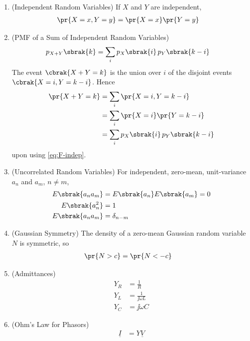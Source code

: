 \begin{enumerate}[label=\thesubsection.\arabic*, ref=\thesubsection.\theenumi, itemsep=0pt, leftmargin=0pt, labelwidth=0pt, itemindent=0pt, labelsep=1em, align=right]
\item (Independent Random Variables) If $X$ and $Y$ are independent,
\begin{align}
\pr{X = x, Y = y} &= \pr{X = x}\pr{Y = y}
\label{eq:F-indep}
\end{align}

\item (PMF of a Sum of Independent Random Variables)
\begin{align}
p_{X+Y}\sbrak{k} &= \sum_{i} p_X\sbrak{i}\, p_Y\sbrak{k - i}
\label{eq:F-conv-pmf}
\end{align}
\solution The event $\cbrak{X + Y = k}$ is the union over $i$ of the disjoint events $\cbrak{X = i, Y = k - i}$. Hence
\begin{align}
\pr{X + Y = k} &= \sum_{i} \pr{X = i, Y = k - i}
\\
&= \sum_{i} \pr{X = i}\pr{Y = k - i}
\\
&= \sum_{i} p_X\sbrak{i}\, p_Y\sbrak{k - i}
\end{align}
upon using \eqref{eq:F-indep}.

\item (Uncorrelated Random Variables) For independent, zero-mean, unit-variance $a_n$ and $a_m$, $n \ne m$,
\begin{align}
E\sbrak{a_n a_m} &= E\sbrak{a_n}E\sbrak{a_m} = 0
\\
E\sbrak{a_n^2} &= 1
\\
E\sbrak{a_n a_m} &= \delta_{n - m}
\label{eq:F-uncorr}
\end{align}

\item (Gaussian Symmetry) The density of a zero-mean Gaussian random variable $N$ is symmetric, so
\begin{align}
\pr{N > c} &= \pr{N < -c}
\label{eq:F-gauss-sym}
\end{align}

\item (Admittances)
\begin{align}
Y_R &= \frac{1}{R}
\\
Y_L &= \frac{1}{\jj \omega L}
\\
Y_C &= \jj \omega C
\label{eq:F-admittance}
\end{align}

\item (Ohm's Law for Phasors)
\begin{align}
\underline{I} &= Y \underline{V}
\label{eq:F-phasor-ohm}
\end{align}


\end{enumerate}
